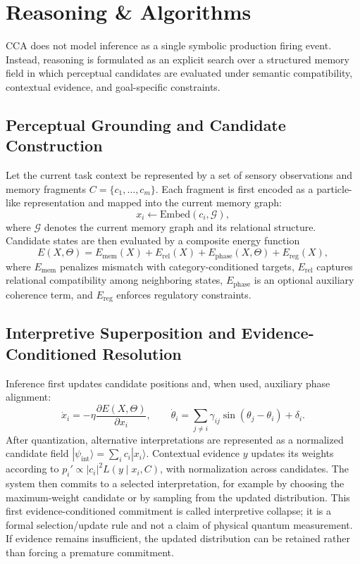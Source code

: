 \documentclass[10pt,journal,compsoc]{IEEEtran}
\begin{document}
\section{Reasoning \& Algorithms}

CCA does not model inference as a single symbolic production firing event. Instead, reasoning is formulated as an explicit search over a structured memory field in which perceptual candidates are evaluated under semantic compatibility, contextual evidence, and goal-specific constraints.

\subsection{Perceptual Grounding and Candidate Construction}

Let the current task context be represented by a set of sensory observations and memory fragments $C = \{c_1, \ldots, c_m\}$. Each fragment is first encoded as a particle-like representation and mapped into the current memory graph:
\[
 x_i \leftarrow \mathrm{Embed}(c_i, \mathcal{G}),
\]
where $\mathcal{G}$ denotes the current memory graph and its relational structure. Candidate states are then evaluated by a composite energy function
\[
E(X,\Theta) = E_{\mathrm{mem}}(X) + E_{\mathrm{rel}}(X) + E_{\mathrm{phase}}(X,\Theta) + E_{\mathrm{reg}}(X),
\]
where $E_{\mathrm{mem}}$ penalizes mismatch with category-conditioned targets, $E_{\mathrm{rel}}$ captures relational compatibility among neighboring states, $E_{\mathrm{phase}}$ is an optional auxiliary coherence term, and $E_{\mathrm{reg}}$ enforces regulatory constraints.

\subsection{Interpretive Superposition and Evidence-Conditioned Resolution}

Inference first updates candidate positions and, when used, auxiliary phase alignment:
\[
\dot{x}_i = -\eta \frac{\partial E(X,\Theta)}{\partial x_i},
\qquad
\dot{\theta}_i =
\sum_{j \neq i} \gamma_{ij}\sin(\theta_j - \theta_i) + \delta_i.
\]
After quantization, alternative interpretations are represented as a normalized candidate field $|\psi_{\mathrm{int}}\rangle=\sum_i c_i|x_i\rangle$. Contextual evidence $y$ updates its weights according to $p_i' \propto |c_i|^2 L(y\mid x_i,C)$, with normalization across candidates. The system then commits to a selected interpretation, for example by choosing the maximum-weight candidate or by sampling from the updated distribution. This first evidence-conditioned commitment is called interpretive collapse; it is a formal selection/update rule and not a claim of physical quantum measurement. If evidence remains insufficient, the updated distribution can be retained rather than forcing a premature commitment.
\end{document}
